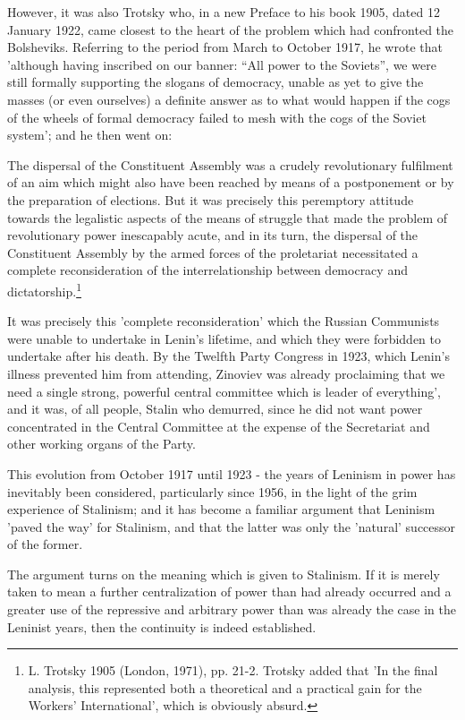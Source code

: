 However, it was also Trotsky who, in a new Preface to his book 1905, dated 12 January 1922, came closest to the heart of the problem which had confronted the Bolsheviks. Referring to the period from March to October 1917, he wrote that 'although having inscribed on our banner: “All power to the Soviets”, we were still formally supporting the slogans of democracy, unable as yet to give the masses (or even ourselves) a definite answer as to what would happen if the cogs of the wheels of formal democracy failed to mesh with the cogs of the Soviet system'; and he then went on:
\begin{displayquote}
    The dispersal of the Constituent Assembly was a crudely revolutionary fulfilment of an aim which might also have been reached by means of a postponement or by the preparation of elections. But it was precisely this peremptory attitude towards the legalistic aspects of the means of struggle that made the problem of revolutionary power inescapably acute, and in its turn, the dispersal of the Constituent Assembly by the armed forces of the proletariat necessitated a complete reconsideration of the interrelationship between democracy and dictatorship.\footnote{L. Trotsky 1905 (London, 1971), pp. 21-2. Trotsky added that 'In the final analysis, this represented both a theoretical and a practical gain for the Workers' International', which is obviously absurd.}
\end{displayquote}

It was precisely this 'complete reconsideration' which the Russian Communists were unable to undertake in Lenin's lifetime, and which they were forbidden to undertake after his death. By the Twelfth Party Congress in 1923, which Lenin's illness prevented him from attending, Zinoviev was already proclaiming that we need a single strong, powerful central committee which is leader of everything', and it was, of all people, Stalin who demurred, since he did not want power concentrated in the Central Committee at the expense of the Secretariat and other working organs of the Party.

This evolution from October 1917 until 1923 - the years of Leninism in power has inevitably been considered, particularly since 1956, in the light of the grim experience of Stalinism; and it has become a familiar argument that Leninism 'paved the way' for Stalinism, and that the latter was only the 'natural' successor of the former.

The argument turns on the meaning which is given to Stalinism. If it is merely taken to mean a further centralization of power than had already occurred and a greater use of the repressive and arbitrary power than was already the case in the Leninist years, then the continuity is indeed established.

